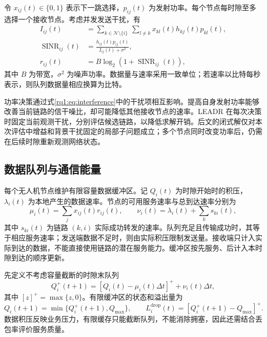 令 $x_{ij}(t)\in\{0,1\}$ 表示下一跳选择，$p_{ij}(t)$ 为发射功率。每个节点每时隙至多选择一个接收节点。考虑并发发送干扰，有
\begin{align}
 I_{ij}(t)&=\sum_{k\in\mathcal{N}\setminus\{i\}}\ \sum_{l\ne k}
              x_{kl}(t)h_{kj}(t)p_{kl}(t),
 \label{rq1:eq:interference}\\
 \operatorname{SINR}_{ij}(t)&=\frac{h_{ij}(t)p_{ij}(t)}{I_{ij}(t)+\sigma^2},
 \label{rq1:eq:sinr}\\
 r_{ij}(t)&=B\log_2\!\left(1+\operatorname{SINR}_{ij}(t)\right),
 \label{rq1:eq:rate}
\end{align}
其中 $B$ 为带宽，$\sigma^2$ 为噪声功率。数据量与速率采用一致单位；若速率以比特每秒表示，则队列数据量相应换算为比特。

功率决策通过式\eqref{rq1:eq:interference}中的干扰项相互影响。提高自身发射功率能够改善当前链路的信干噪比，却可能降低其他接收节点的速率。LEADR 在每次决策时固定当前观测干扰，分别评估候选链路，以降低求解开销。后文的闭式解仅对本次评估中增益和背景干扰固定的局部子问题成立；多个节点同时改变功率后，仍需在后续时隙重新观测网络状态。

\subsection{数据队列与通信能量}

每个无人机节点维护有限容量数据缓冲区。记 $Q_i(t)$ 为时隙开始时的积压，$\lambda_i(t)$ 为本地产生的数据速率。节点的可用服务速率与总到达速率分别为
\begin{equation}
 \mu_i(t)=\sum_j x_{ij}(t)r_{ij}(t),\qquad
 \nu_i(t)=\lambda_i(t)+\sum_k s_{ki}(t),
 \label{rq1:eq:arrival_service}
\end{equation}
其中 $s_{ki}(t)$ 为链路 $(k,i)$ 实际成功转发的速率。队列充足且传输成功时，其等于相应服务速率；发送端数据不足时，则由实际积压限制发送量。接收端只计入实际到达的数据，不能直接使用链路的潜在服务能力。缓冲区按先服务、后计入本时隙到达的顺序更新。

先定义不考虑容量截断的时隙末队列
\begin{equation}
 Q_i^{+}(t+1)=[Q_i(t)-\mu_i(t)\Delta t]^++\nu_i(t)\Delta t,
 \label{rq1:eq:queue_uncapped}
\end{equation}
其中 $[z]^+=\max\{z,0\}$。有限缓冲区的状态和溢出量为
\begin{equation}
 Q_i(t+1)=\min\{Q_i^{+}(t+1),Q_{\max}\},\qquad
 L_i^{\mathrm{drop}}(t)=[Q_i^{+}(t+1)-Q_{\max}]^+.
 \label{rq1:eq:queue_capped}
\end{equation}
数据积压反映业务压力，有限缓存只能截断队列，不能消除拥塞，因此还需结合丢包率评价服务质量。

